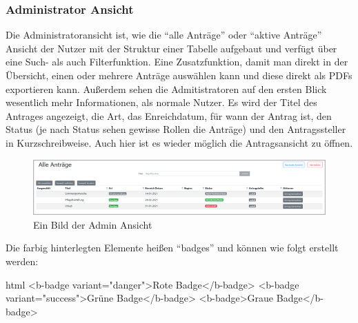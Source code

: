 \subsubsection{Administrator Ansicht}
\label{chapter:implementierung-frontend-komponenten-admin}
Die Administratoransicht ist, wie die \enquote{alle Anträge} oder \enquote{aktive Anträge} Ansicht der Nutzer mit der Struktur einer Tabelle aufgebaut und verfügt über eine Such- als auch Filterfunktion. Eine Zusatzfunktion, damit man direkt in der Übersicht, einen oder mehrere Anträge auswählen kann und diese direkt als PDFs exportieren kann. Außerdem sehen die Admitistratoren auf den ersten Blick wesentlich mehr Informationen, als normale Nutzer. Es wird der Titel des Antrages angezeigt, die Art, das Enreichdatum, für wann der Antrag ist, den Status (je nach Status sehen gewisse Rollen die Anträge) und den Antragssteller in Kurzschreibweise. Auch hier ist es wieder möglich die Antragsansicht zu öffnen.
\begin{figure}[H]
	\centering
	\includegraphics[width=1\linewidth]{images/website/admin}
	\caption[Administrator Ansicht]{Ein Bild der Admin Ansicht}
	\label{fig:adminview}
\end{figure}
Die farbig hinterlegten Elemente heißen \enquote{badges} und können wie folgt erstellt werden:
\begin{code}{html}
	<b-badge variant="danger">Rote Badge</b-badge>
	<b-badge variant="success">Grüne Badge</b-badge>
	<b-badge>Graue Badge</b-badge>
\end{code}
	\label{list:badgebsp} ~\\
~\\

\newpage
